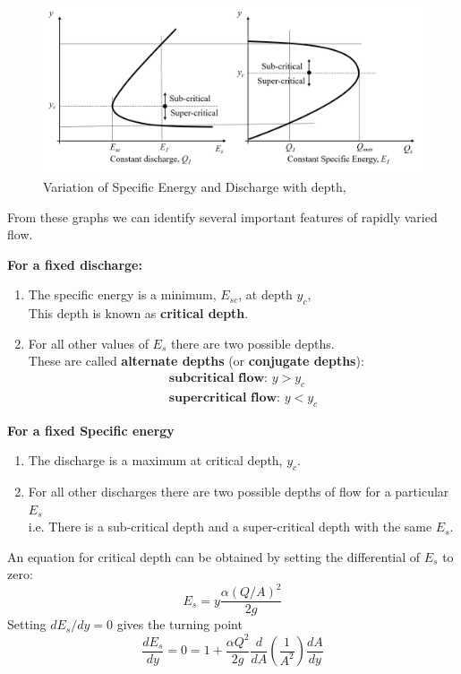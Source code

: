 \documentclass[a4paper, 12pt, british]{article} %
\numberwithin{equation}{section}
\numberwithin{figure}{section}
\numberwithin{table}{section}
\begin{document}
    \begin{figure}[H]
 	\centering
 	\includegraphics[scale=0.5]{./images/Es_Q_2018.png}
 	\caption{Variation of Specific Energy and Discharge with depth, \cite{chadwick}}
 	\label{fig:1101}
 \end{figure} 
From these graphs we can identify several important features of rapidly varied flow.

\textbf{For a fixed discharge:}\\
\begin{enumerate}
	\item The specific energy is a minimum, $E_{sc}$, at depth $y_c$, \\
This depth is known as \textbf{ critical depth}.
\item For all other values of $E_s$ there are two possible depths. \\
These are called \textbf{alternate depths} (or \textbf{conjugate depths}):
\begin{align*}
\textbf{subcritical flow:  } y > y_c \\
\textbf{supercritical flow:  } y < y_c
\end{align*}
\end{enumerate}


\textbf{For a fixed Specific energy}\\
\begin{enumerate}
	\item The discharge is a maximum at critical depth, $y_c$.
	\item For all other discharges there are two possible depths of flow for a particular $E_s$\\
i.e. There is a sub-critical depth and a super-critical depth with the same $E_s$.
\end{enumerate}

An equation for critical depth can be obtained by setting the differential of $E_s$ to zero:
\begin{equation}
E_s = y \frac{\alpha (Q/A)^2}{2g}
\end{equation}
Setting $dE_s/dy = 0$ gives the turning point
\begin{equation}
\frac{dE_s}{dy} = 0 = 1 + \frac{\alpha Q^2}{2g} \frac{d}{dA}\left(\frac{1}{A^2}\right)\frac{dA}{dy}
\end{equation}
 
\end{document}
